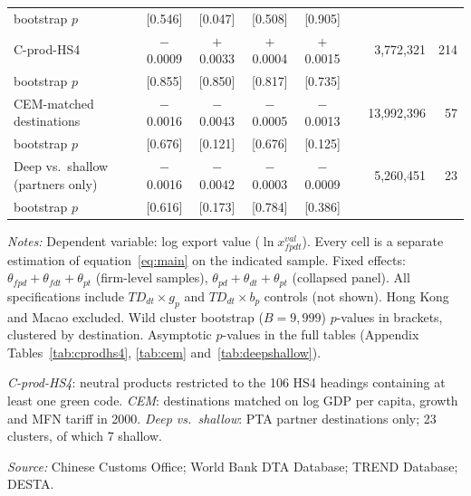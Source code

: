 \begin{table}[htbp]
\begin{threeparttable}
\begin{tabular}{lcccccrr}
\quad bootstrap $p$         & [0.546] & [0.047] & [0.508] & [0.905] & & & \\[4pt]
C-prod-HS4                  & $-$0.0009 & $+$0.0033 & $+$0.0004 & $+$0.0015 & & 3,772,321 & 214 \\
\quad bootstrap $p$         & [0.855] & [0.850] & [0.817] & [0.735] & & & \\[4pt]
CEM-matched destinations    & $-$0.0016 & $-$0.0043 & $-$0.0005 & $-$0.0013 & & 13,992,396 & 57 \\
\quad bootstrap $p$         & [0.676] & [0.121] & [0.676] & [0.125] & & & \\[4pt]
Deep vs.\ shallow (partners only) & $-$0.0016 & $-$0.0042 & $-$0.0003 & $-$0.0009 & & 5,260,451 & 23 \\
\quad bootstrap $p$         & [0.616] & [0.173] & [0.784] & [0.386] & & & \\
\bottomrule
\end{tabular}
\begin{tablenotes}[flushleft]\footnotesize
\item \textit{Notes:} Dependent variable: log export value ($\ln x^{val}_{fpdt}$). Every cell is a separate estimation of equation~\eqref{eq:main} on the indicated sample. Fixed effects: $\theta_{fpd} + \theta_{fdt} + \theta_{pt}$ (firm-level samples), $\theta_{pd} + \theta_{dt} + \theta_{pt}$ (collapsed panel). All specifications include $TD_{dt} \times g_p$ and $TD_{dt} \times b_p$ controls (not shown). Hong Kong and Macao excluded. Wild cluster bootstrap ($B = 9{,}999$) $p$-values in brackets, clustered by destination. Asymptotic $p$-values in the full tables (Appendix Tables~\ref{tab:cprodhs4}, \ref{tab:cem} and~\ref{tab:deepshallow}).
\item \textit{C-prod-HS4}: neutral products restricted to the 106 HS4 headings containing at least one green code. \textit{CEM}: destinations matched on log GDP per capita, growth and MFN tariff in 2000. \textit{Deep vs.\ shallow}: PTA partner destinations only; 23 clusters, of which 7 shallow.
\item \textit{Source:} Chinese Customs Office; World Bank DTA Database; TREND Database; DESTA.
\end{tablenotes}
\end{threeparttable}
\end{table}
